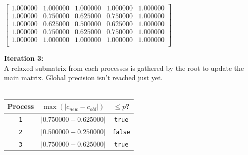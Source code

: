 \documentclass[11pt]{article}
\begin{document}
\hspace{-0.4cm}\begin{minipage}{0.47\textwidth}
$
\begin{bmatrix}
1.000000 & 1.000000 & 1.000000 & 1.000000 & 1.000000 \\
1.000000 & 0.750000 & 0.625000 & 0.750000 & 1.000000 \\
1.000000 & 0.625000 & 0.500000 & 0.625000 & 1.000000 \\
1.000000 & 0.750000 & 0.625000 & 0.750000 & 1.000000 \\
1.000000 & 1.000000 & 1.000000 & 1.000000 & 1.000000 \\
\end{bmatrix}
$
\end{minipage}\hspace{1.8cm}{\color{cyan!90}\vline}\hspace{0.5cm}
\begin{minipage}{.47\textwidth}\textbf{Iteration 3:}\\
A relaxed submatrix from each processes is gathered by the root to update the main matrix. Global precision isn't reached just yet.
\\
\\
\begin{tabular}{|c|c|c|}
\hline
\textbf{Process} & \textbf{$\max(|c_{new}-c_{old}|)$} & \textbf{$\leq p$?} \\
\hline
\texttt{1} & $|0.750000-0.625000|$ & {\color{blue}\texttt{true}}\\
\texttt{2} & $|0.500000-0.250000|$ & {\color{red}\texttt{false}}\\
\texttt{3} & $|0.750000-0.625000|$ & {\color{blue}\texttt{true}}\\
\hline
\end{tabular}
\end{minipage}
\end{document}

